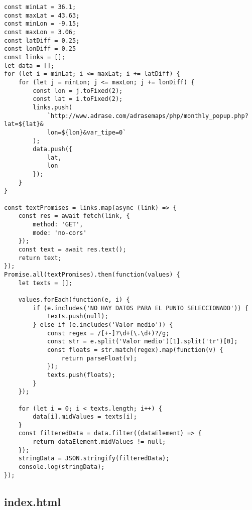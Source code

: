 \begin{lstlisting}[style=ES6, caption={public/scripts/generateLinks.js}]
const minLat = 36.1;
const maxLat = 43.63;
const minLon = -9.15;
const maxLon = 3.06;
const latDiff = 0.25;
const lonDiff = 0.25
const links = [];
let data = [];
for (let i = minLat; i <= maxLat; i += latDiff) {
	for (let j = minLon; j <= maxLon; j += lonDiff) {
		const lon = j.toFixed(2);
		const lat = i.toFixed(2);
		links.push(
			`http://www.adrase.com/adrasemaps/php/monthly_popup.php?lat=${lat}&
			lon=${lon}&var_tipe=0`
		);
		data.push({
			lat,
			lon
		});
	}
}

const textPromises = links.map(async (link) => {
	const res = await fetch(link, {
		method: 'GET',
		mode: 'no-cors'
	});
	const text = await res.text();
	return text;
});
Promise.all(textPromises).then(function(values) {
	let texts = [];

	values.forEach(function(e, i) {
		if (e.includes('NO HAY DATOS PARA EL PUNTO SELECCIONADO')) {
			texts.push(null);
		} else if (e.includes('Valor medio')) {
			const regex = /[+-]?\d+(\.\d+)?/g;
			const str = e.split('Valor medio')[1].split('tr')[0];
			const floats = str.match(regex).map(function(v) {
				return parseFloat(v);
			});
			texts.push(floats);
		}
	});

	for (let i = 0; i < texts.length; i++) {
		data[i].midValues = texts[i];
	}
	const filteredData = data.filter((dataElement) => {
		return dataElement.midValues != null;
	});
	stringData = JSON.stringify(filteredData);
	console.log(stringData);
});

\end{lstlisting}

\subsection{index.html}

